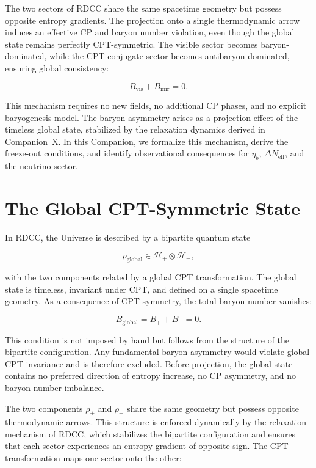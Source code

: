 \documentclass[11pt,a4paper]{article}
\newcommand{\Hglobal}{\mathcal{H}_{+}\!\otimes\!\mathcal{H}_{-}}
\newcommand{\rglobal}{\rho_{\mathrm{global}}}
\newcommand{\rplus}{\rho_{+}}
\newcommand{\rminus}{\rho_{-}}
\begin{document}
The two sectors of RDCC share the same spacetime geometry but possess opposite
entropy gradients. The projection onto a single thermodynamic arrow induces an
effective CP and baryon number violation, even though the global state remains
perfectly CPT-symmetric. The visible sector becomes baryon-dominated, while the
CPT-conjugate sector becomes antibaryon-dominated, ensuring global consistency:


\[
B_{\mathrm{vis}} + B_{\mathrm{mir}} = 0.
\]



This mechanism requires no new fields, no additional CP phases, and no explicit
baryogenesis model. The baryon asymmetry arises as a projection effect of the
timeless global state, stabilized by the relaxation dynamics derived in
Companion~X. In this Companion, we formalize this mechanism, derive the
freeze-out conditions, and identify observational consequences for
$\eta_b$, $\Delta N_{\mathrm{eff}}$, and the neutrino sector.




\section{The Global CPT-Symmetric State}

In RDCC, the Universe is described by a bipartite quantum state


\[
\rglobal \in \Hglobal,
\]


with the two components related by a global CPT transformation. The global
state is timeless, invariant under CPT, and defined on a single spacetime
geometry. As a consequence of CPT symmetry, the total baryon number vanishes:


\[
B_{\mathrm{global}} = B_{+} + B_{-} = 0.
\]



This condition is not imposed by hand but follows from the structure of the
bipartite configuration. Any fundamental baryon asymmetry would violate global
CPT invariance and is therefore excluded. Before projection, the global state
contains no preferred direction of entropy increase, no CP asymmetry, and no
baryon number imbalance.

The two components $\rplus$ and $\rminus$ share the same geometry but possess
opposite thermodynamic arrows. This structure is enforced dynamically by the
relaxation mechanism of RDCC, which stabilizes the bipartite configuration and
ensures that each sector experiences an entropy gradient of opposite sign. The
CPT transformation maps one sector onto the other:
\end{document}
